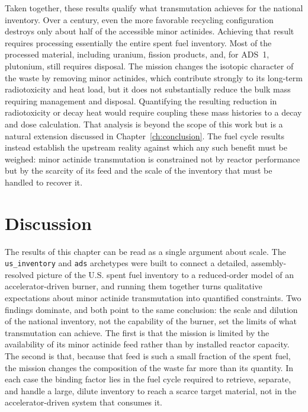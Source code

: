 Taken together, these results qualify what transmutation achieves for the national
inventory. Over a century, even the more favorable recycling configuration
destroys only about half of the accessible minor actinides. Achieving that result
requires processing essentially the entire spent fuel inventory. Most of the
processed material, including uranium, fission products, and, for ADS~1,
plutonium, still requires disposal. The mission changes the isotopic character of
the waste by removing minor actinides, which contribute strongly to its long-term
radiotoxicity and heat load, but it does not substantially reduce the bulk mass
requiring management and disposal. Quantifying the resulting reduction in
radiotoxicity or decay heat would require coupling these mass histories to a decay
and dose calculation. That analysis is beyond the scope of this work but is a
natural extension discussed in Chapter~\ref{ch:conclusion}. The fuel cycle
results instead establish the upstream reality against which any such benefit
must be weighed: minor actinide transmutation is constrained not by reactor
performance but by the scarcity of its feed and the scale of the inventory that
must be handled to recover it.



\section{Discussion}
\label{sec:results-discussion}

The results of this chapter can be read as a single argument about scale. The
\texttt{us\_inventory} and \texttt{ads} archetypes were built to connect a
detailed, assembly-resolved picture of the U.S. spent fuel inventory to a
reduced-order model of an accelerator-driven burner, and running them together
turns qualitative expectations about minor actinide transmutation into quantified
constraints. Two findings dominate, and both point to the same conclusion: the
scale and dilution of the national inventory, not the capability of the burner,
set the limits of what transmutation can achieve. The first is that the
mission is limited by the availability of its minor actinide feed rather than by
installed reactor capacity. The second is that, because that feed is such a
small fraction of the spent fuel, the mission changes the composition of the
waste far more than its quantity. In each case the binding factor lies in the
fuel cycle required to retrieve, separate, and handle a large, dilute inventory
to reach a scarce target material, not in the accelerator-driven system that
consumes it.

